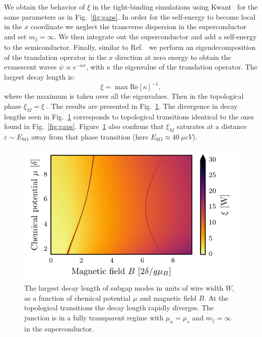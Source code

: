 We obtain the behavior of $\xi$ in the tight-binding simulations using Kwant~\cite{Groth2014} for the same parameters as in Fig.~\ref{fig:gaps}.
In order for the self-energy to become local in the $x$ coordinate we neglect the transverse dispersion in the superconductor and set $m_\parallel = \infty$.
We then integrate out the superconductor and add a self-energy to the semiconductor.
Finally, similar to Ref.~\cite{Nijholt2016} we perform an eigendecomposition of the translation operator in the $x$ direction at zero energy to obtain the evanescent waves $\psi\propto e^{-\kappa x}$, with $\kappa$ the eigenvalue of the translation operator.
The largest decay length is:
\begin{equation}\label{ximnum}
\xi = \max\mathrm{Re}[\kappa]^{-1},
\end{equation}
where the maximum is taken over all the eigenvalues.
Then in the topological phase $\xi_M = \xi$ .
The results are presented in Fig.~\ref{fig:decay_diag}.
The divergence in decay lengths seen in Fig.~\ref{fig:decay_diag} corresponds to topological transitions identical to the ones found in Fig.~\ref{fig:gaps}.
Figure~\ref{fig:decay_diag} also confirms that $\xi_M$ saturates at a distance $\varepsilon \sim E_\textrm{SO}$ away from that phase transition (here $E_\textrm{SO} \approx\SI{40}{\mu eV}$).

\begin{figure}
\begin{center}
\includegraphics[width=0.7\columnwidth]{chapter_shortjunction/figures/decay_length_2d}
\caption{The largest decay length of subgap modes in units of wire width $W$, as a function of chemical potential $\mu$ and magnetic field $B$.
At the topological transitions the decay length rapidly diverges.
The junction is in a fully transparent regime with $\mu_n=\mu_s$ and $m_\parallel =\infty$ in the superconductor.
}
\label{fig:decay_diag}
\end{center}
\end{figure}

